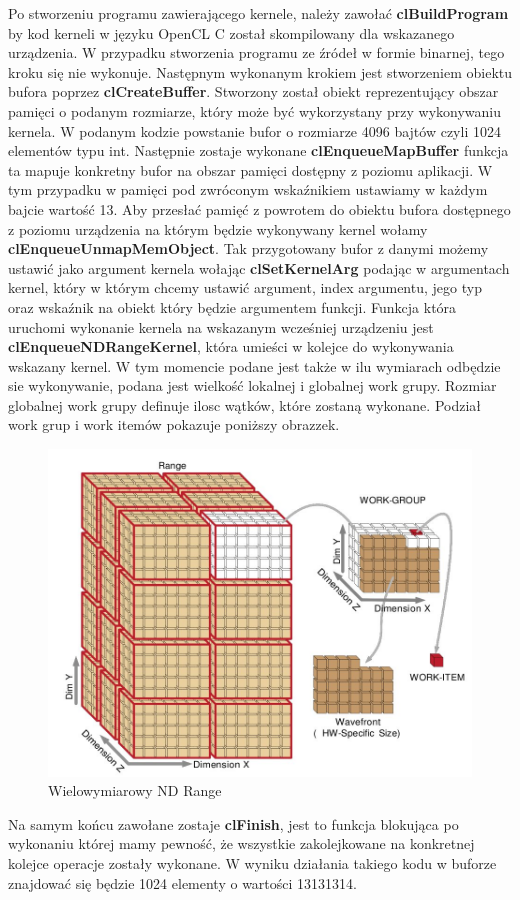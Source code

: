 Po stworzeniu programu zawierającego kernele, należy zawołać \textbf{clBuildProgram} by kod kerneli w języku OpenCL C został skompilowany dla wskazanego urządzenia. W przypadku stworzenia programu ze źródeł w formie binarnej, tego kroku się nie wykonuje.
Następnym wykonanym krokiem jest stworzeniem obiektu bufora poprzez \textbf{clCreateBuffer}. Stworzony został obiekt reprezentujący obszar pamięci o podanym rozmiarze, który może być wykorzystany przy wykonywaniu kernela. W podanym kodzie powstanie bufor o rozmiarze 4096 bajtów czyli 1024 elementów typu int.
Następnie zostaje wykonane \textbf{clEnqueueMapBuffer} funkcja ta mapuje konkretny bufor na obszar pamięci dostępny z poziomu aplikacji. W tym przypadku w pamięci pod zwróconym wskaźnikiem ustawiamy w każdym bajcie wartość 13.
Aby przesłać pamięć z powrotem do obiektu bufora dostępnego z poziomu urządzenia na którym będzie wykonywany kernel wołamy \textbf{clEnqueueUnmapMemObject}.
Tak przygotowany bufor z danymi możemy ustawić jako argument kernela wołając \textbf{clSetKernelArg} podając w argumentach kernel, który w którym chcemy ustawić argument, index argumentu, jego typ oraz wskaźnik na obiekt który będzie argumentem funkcji.
Funkcja która uruchomi wykonanie kernela na wskazanym wcześniej urządzeniu jest \textbf{clEnqueueNDRangeKernel}, która umieści w kolejce do wykonywania wskazany kernel. W tym momencie podane jest także w ilu wymiarach odbędzie sie wykonywanie, podana jest wielkość lokalnej i globalnej work grupy. Rozmiar globalnej work grupy definuje ilosc wątków, które zostaną wykonane. Podział work grup i work itemów pokazuje poniższy obrazzek.
\begin{figure}[H]
	\includegraphics[scale=0.4]{imgs/WorkDims.jpg}
	\caption{Wielowymiarowy ND Range}
\end{figure}
Na samym końcu zawołane zostaje \textbf{clFinish}, jest to funkcja blokująca po wykonaniu której mamy pewność, że wszystkie zakolejkowane na konkretnej kolejce operacje zostały wykonane.
W wyniku działania takiego kodu w buforze znajdować się będzie 1024 elementy o wartości 13131314.
